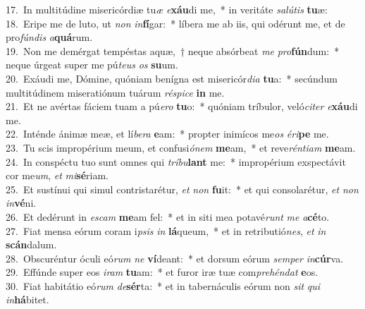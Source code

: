 {17.~}In multitúdine misericórdiæ tu\textit{æ} \textit{e}\textbf{xáu}di me,~* in veritáte \textit{sa}\textit{lú}\textit{tis} \textbf{tu}æ:\\
{18.~}Eripe me de luto, ut \textit{non} \textit{in}\textbf{fí}gar:~* líbera me ab iis, qui odérunt me, et de pro\textit{fún}\textit{dis} \textit{a}\textbf{quá}rum.\\
{19.~}Non me demérgat tempéstas aquæ,~† neque absórbeat \textit{me} \textit{pro}\textbf{fún}dum:~* neque úrgeat super me pú\textit{te}\textit{us} \textit{os} \textbf{su}um.\\
{20.~}Exáudi me, Dómine, quóniam benígna est misericór\textit{di}\textit{a} \textbf{tu}a:~* secúndum multitúdinem miseratiónum tuárum \textit{ré}\textit{spi}\textit{ce} \textbf{in} me.\\
{21.~}Et ne avértas fáciem tuam a pú\textit{e}\textit{ro} \textbf{tu}o:~* quóniam tríbulor, veló\textit{ci}\textit{ter} \textit{e}\textbf{xáu}di me.\\
{22.~}Inténde ánimæ meæ, et lí\textit{be}\textit{ra} \textbf{e}am:~* propter inimícos me\textit{os} \textit{é}\textit{ri}\textbf{pe} me.\\
{23.~}Tu scis impropérium meum, et confusi\textit{ó}\textit{nem} \textbf{me}am,~* et reve\textit{rén}\textit{ti}\textit{am} \textbf{me}am.\\
{24.~}In conspéctu tuo sunt omnes qui \textit{trí}\textit{bu}\textbf{lant} me:~* impropérium exspectávit cor me\textit{um}, \textit{et} \textit{mi}\textbf{sé}riam.\\
{25.~}Et sustínui qui simul contristarétur, \textit{et} \textit{non} \textbf{fu}it:~* et qui consolarétur, \textit{et} \textit{non} \textit{in}\textbf{vé}ni.\\
{26.~}Et dedérunt in \textit{e}\textit{scam} \textbf{me}am fel:~* et in siti mea potavé\textit{runt} \textit{me} \textit{a}\textbf{cé}to.\\
{27.~}Fiat mensa eórum coram i\textit{psis} \textit{in} \textbf{lá}queum,~* et in retributió\textit{nes}, \textit{et} \textit{in} \textbf{scán}dalum.\\
{28.~}Obscuréntur óculi eó\textit{rum} \textit{ne} \textbf{ví}deant:~* et dorsum eórum \textit{sem}\textit{per} \textit{in}\textbf{cúr}va.\\
{29.~}Effúnde super eos \textit{i}\textit{ram} \textbf{tu}am:~* et furor iræ tuæ com\textit{pre}\textit{hén}\textit{dat} \textbf{e}os.\\
{30.~}Fiat habitátio eó\textit{rum} \textit{de}\textbf{sér}ta:~* et in tabernáculis eórum non \textit{sit} \textit{qui} \textit{in}\textbf{há}bitet.\\
